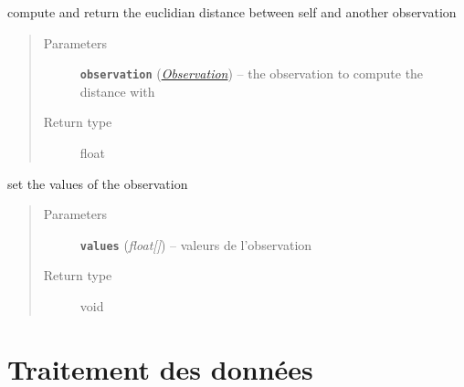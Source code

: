 \documentclass[letterpaper,10pt,english]{sphinxmanual}
\begin{document}
\begin{fulllineitems}
\begin{fulllineitems}
\begin{quote}
\begin{description}
\end{description}\end{quote}

\end{fulllineitems}


\begin{fulllineitems}
\label{impl:kmeans.Observation.dist}
compute and return the euclidian distance between self                  and another observation
\begin{quote}\begin{description}
\item[{Parameters}] \leavevmode
\textbf{\texttt{observation}} ({\hyperref[impl:kmeans.Observation]{\emph{\emph{Observation}}}}) -- the observation to compute the distance with

\item[{Return type}] \leavevmode
float

\end{description}\end{quote}

\end{fulllineitems}


\begin{fulllineitems}
\label{impl:kmeans.Observation.set_values}
set the values of the observation
\begin{quote}\begin{description}
\item[{Parameters}] \leavevmode
\textbf{\texttt{values}} (\emph{float{[}{]}}) -- valeurs de l'observation

\item[{Return type}] \leavevmode
void

\end{description}\end{quote}

\end{fulllineitems}


\end{fulllineitems}



\section{Traitement des données}
\label{data:data}\label{data::doc}\label{data:traitement-des-donnees}
\end{document}
